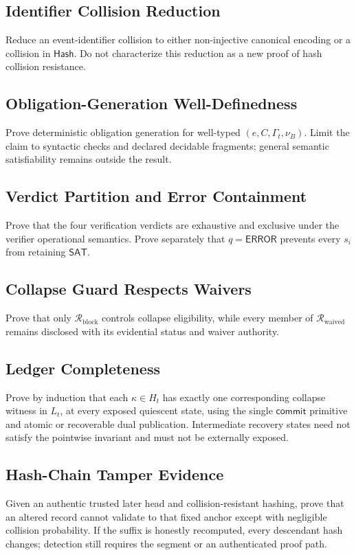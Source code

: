 \documentclass[11pt,openany]{book}
\newcommand{\Hash}{\mathsf{Hash}}
\newcommand{\ErrorVerdict}{\mathsf{ERROR}}
\begin{document}
\subsection{Identifier Collision Reduction}
Reduce an event-identifier collision to either non-injective canonical encoding
or a collision in \(\Hash\). Do not characterize this reduction as a new proof
of hash collision resistance.

\subsection{Obligation-Generation Well-Definedness}
Prove deterministic obligation generation for well-typed
\((e,C,\Gamma_t,\nu_B)\). Limit the claim to syntactic checks and declared
decidable fragments; general semantic satisfiability remains outside the
result.

\subsection{Verdict Partition and Error Containment}
Prove that the four verification verdicts are exhaustive and exclusive under
the verifier operational semantics. Prove separately that
\(q=\ErrorVerdict\) prevents every \(s_i\) from retaining
\(\mathsf{SAT}\).

\subsection{Collapse Guard Respects Waivers}
Prove that only \(\mathcal R_{\mathrm{block}}\) controls collapse eligibility,
while every member of \(\mathcal R_{\mathrm{waived}}\) remains disclosed with
its evidential status and waiver authority.

\subsection{Ledger Completeness}
Prove by induction that each \(\kappa\in H_t\) has exactly one corresponding
collapse witness in \(L_t\), at every exposed quiescent state, using the
single \(\mathsf{commit}\) primitive and atomic or recoverable dual
publication. Intermediate recovery states need not satisfy the pointwise
invariant and must not be externally exposed.

\subsection{Hash-Chain Tamper Evidence}
Given an authentic trusted later head and collision-resistant hashing, prove
that an altered record cannot validate to that fixed anchor except with
negligible collision probability. If the suffix is honestly recomputed, every
descendant hash changes; detection still requires the segment or an
authenticated proof path.
\end{document}
